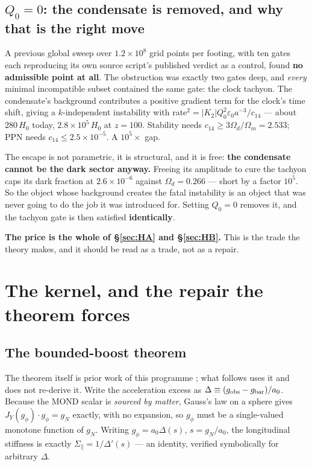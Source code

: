 \documentclass[11pt,letterpaper]{article}
\begin{document}
\subsection{$Q_0=0$: the condensate is removed, and why that is the right move}\label{sec:q0}
A previous global sweep over $1.2\times10^{8}$ grid points per footing, with ten gates each reproducing its own source script's published verdict as a control, found \textbf{no admissible point at all}. The obstruction was exactly two gates deep, and \emph{every} minimal incompatible subset contained the same gate: the clock tachyon. The condensate's background contributes a positive gradient term for the clock's time shift, giving a $k$-independent instability with rate$^2=|K_2|Q_0^2\varepsilon_0a^{-3}/c_{14}$ --- about $280\,H_0$ today, $2.8\times10^{5}\,H_0$ at $z=100$. Stability needs $c_{14}\ge3\Omega_d/\Omega_m=2.533$; PPN needs $c_{14}\le2.5\times10^{-5}$. A $10^{5}\times$ gap.

The escape is not parametric, it is structural, and it is free: \textbf{the condensate cannot be the dark sector anyway.} Freeing its amplitude to cure the tachyon caps its dark fraction at $2.6\times10^{-6}$ against $\Omega_d=0.266$ --- short by a factor $10^{5}$. So the object whose background creates the fatal instability is an object that was never going to do the job it was introduced for. Setting $Q_0=0$ removes it, and the tachyon gate is then satisfied \textbf{identically}.

\textbf{The price is the whole of \S\ref{sec:HA} and \S\ref{sec:HB}.} This is the trade the theory makes, and it should be read as a trade, not as a repair.

\section{The kernel, and the repair the theorem forces}\label{sec:kernel}
\subsection{The bounded-boost theorem}

The theorem itself is prior work of this programme \cite{z22548669}; what follows uses it and does not re-derive it.
Write the acceleration excess as $\Delta\equiv(g_{\rm obs}-g_{\rm bar})/a_0$. Because the MOND scalar is \emph{sourced by matter}, Gauss's law on a sphere gives $J_Y(g_\phi)\cdot g_\phi=g_N$ exactly, with no expansion, so $g_\phi$ must be a single-valued monotone function of $g_N$. Writing $g_\phi=a_0\Delta(s)$, $s=g_N/a_0$, the longitudinal stiffness is exactly $\Sigma_\parallel=1/\Delta'(s)$ --- an identity, verified symbolically for arbitrary $\Delta$.
\end{document}
